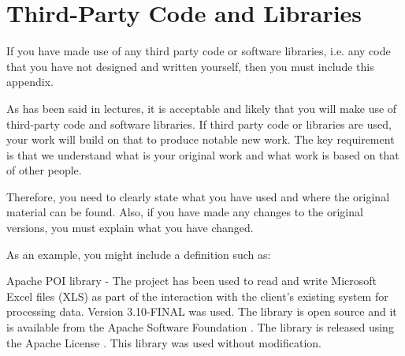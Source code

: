 \chapter{Third-Party Code and Libraries}

If you have made use of any third party code or software libraries, i.e. any code
that you have not designed and written yourself, then you must include this appendix.

As has been said in lectures, it is acceptable and likely that you will make use of
 third-party code and software libraries. If third party code or libraries are used,
  your work will build on that to produce notable new work. The key requirement is that we understand what is your original work and what work is based on that of other people.

Therefore, you need to clearly state what you have used and where the original material can be found. Also, if you have made any changes to the original versions, you must explain what you have changed.

As an example, you might include a definition such as:

Apache POI library - The project has been used to read and write Microsoft Excel files (XLS) as part of the interaction with the client's existing system for processing data. Version 3.10-FINAL was used. The library is open source and it is available from the Apache Software Foundation
\cite{apache_poi}. The library is released using the Apache License
\cite{apache_license}. This library was used without modification.
